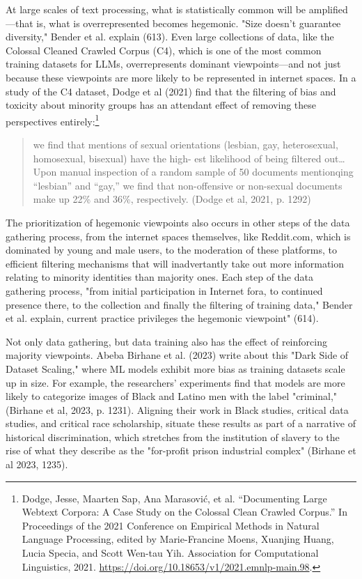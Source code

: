 \documentclass[11pt]{article}
\begin{document}
\begin{enumerate}
At large scales of text processing, what is statistically common will
be amplified---that is, what is overrepresented becomes hegemonic.
"Size doesn't guarantee diversity," Bender et al. explain (613). Even
large collections of data, like the Colossal Cleaned Crawled Corpus
(C4), which is one of the most common training datasets for LLMs,
overrepresents dominant viewpoints---and not just because these
viewpoints are more likely to be represented in internet spaces. In a
study of the C4 dataset, Dodge et al (2021) find that the filtering of
bias and toxicity about minority groups has an attendant effect of
removing these perspectives entirely:\footnote{Dodge, Jesse, Maarten Sap, Ana Marasović, et al. “Documenting
Large Webtext Corpora: A Case Study on the Colossal Clean Crawled
Corpus.” In Proceedings of the 2021 Conference on Empirical Methods in
Natural Language Processing, edited by Marie-Francine Moens, Xuanjing
Huang, Lucia Specia, and Scott Wen-tau Yih. Association for
Computational Linguistics, 2021.
\url{https://doi.org/10.18653/v1/2021.emnlp-main.98}.}
\begin{quote}
we find that mentions of sexual orientations (lesbian, gay,
heterosexual, homosexual, bisexual) have the high- est likelihood of
being filtered out\ldots{} Upon manual inspection of a random sample of 50
documents mentionqing “lesbian” and “gay,” we find that non-offensive
or non-sexual documents make up 22\% and 36\%, respectively. (Dodge et
al, 2021, p. 1292)
\end{quote}
The prioritization of hegemonic viewpoints also occurs in other steps
of the data gathering process, from the internet spaces themselves,
like Reddit.com, which is dominated by young and male users, to the
moderation of these platforms, to efficient filtering mechanisms that
will inadvertantly take out more information relating to minority
identities than majority ones. Each step of the data gathering
process, "from initial participation in Internet fora, to continued
presence there, to the collection and finally the filtering of
training data," Bender et al. explain, current practice privileges the
hegemonic viewpoint" (614).

Not only data gathering, but data training also has the effect of
reinforcing majority viewpoints. Abeba Birhane et al. (2023) write
about this "Dark Side of Dataset Scaling," where ML models exhibit
more bias as training datasets scale up in size. For example, the
researchers' experiments find that models are more likely to
categorize images of Black and Latino men with the label "criminal,"
(Birhane et al, 2023, p. 1231). Aligning their work in Black studies,
critical data studies, and critical race scholarship, situate these
results as part of a narrative of historical discrimination, which
stretches from the institution of slavery to the rise of what they
describe as the "for-profit prison industrial complex" (Birhane et al
2023, 1235).


\end{enumerate}
\end{document}
